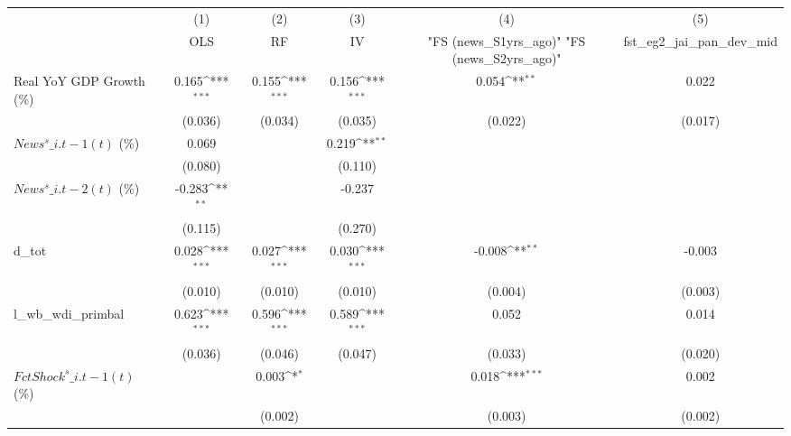 {
\def\sym#1{\ifmmode^{#1}\else\(^{#1}\)\fi}
\begin{tabular}{l*{5}{c}}
\toprule
                    &\multicolumn{1}{c}{(1)}&\multicolumn{1}{c}{(2)}&\multicolumn{1}{c}{(3)}&\multicolumn{1}{c}{(4)}&\multicolumn{1}{c}{(5)}\\
                    &\multicolumn{1}{c}{OLS}&\multicolumn{1}{c}{RF}&\multicolumn{1}{c}{IV}&\multicolumn{1}{c}{ "FS (news\_S1yrs\_ago)"  "FS (news\_S2yrs\_ago)" }&\multicolumn{1}{c}{fst\_eg2\_jai\_pan\_dev\_mid}\\
\midrule
Real YoY GDP Growth (\%)&       0.165\sym{***}&       0.155\sym{***}&       0.156\sym{***}&       0.054\sym{**} &       0.022         \\
                    &     (0.036)         &     (0.034)         &     (0.035)         &     (0.022)         &     (0.017)         \\
\addlinespace
$ News^s\_{i.t-1}(t)$ (\%)&       0.069         &                     &       0.219\sym{**} &                     &                     \\
                    &     (0.080)         &                     &     (0.110)         &                     &                     \\
\addlinespace
$ News^s\_{i.t-2}(t)$ (\%)&      -0.283\sym{**} &                     &      -0.237         &                     &                     \\
                    &     (0.115)         &                     &     (0.270)         &                     &                     \\
\addlinespace
d\_tot               &       0.028\sym{***}&       0.027\sym{***}&       0.030\sym{***}&      -0.008\sym{**} &      -0.003         \\
                    &     (0.010)         &     (0.010)         &     (0.010)         &     (0.004)         &     (0.003)         \\
\addlinespace
l\_wb\_wdi\_primbal    &       0.623\sym{***}&       0.596\sym{***}&       0.589\sym{***}&       0.052         &       0.014         \\
                    &     (0.036)         &     (0.046)         &     (0.047)         &     (0.033)         &     (0.020)         \\
\addlinespace
$ FctShock^s\_{i.t-1}(t)$ (\%)&                     &       0.003\sym{*}  &                     &       0.018\sym{***}&       0.002         \\
                    &                     &     (0.002)         &                     &     (0.003)         &     (0.002)         \\

\end{tabular}}
